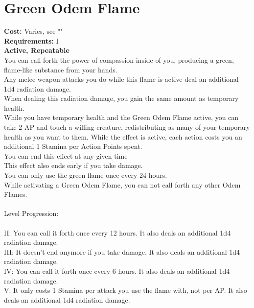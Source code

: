 \section{Green Odem Flame}\label{perk:greenOdemFlame}
\textbf{Cost:} Varies, see ""\\
\textbf{Requirements:} I\\
\textbf{Active, Repeatable}\\
You can call forth the power of compassion inside of you, producing a green, flame-like substance from your hands.\\
Any melee weapon attacks you do while this flame is active deal an additional 1d4 radiation damage.\\
When dealing this radiation damage, you gain the same amount as temporary health.\\
While you have temporary health and the Green Odem Flame active, you can take 2 AP and touch a willing creature, redistributing as many of your temporary health as you want to them.
While the effect is active, each action costs you an additional 1 Stamina per Action Points spent.\\
You can end this effect at any given time\\
This effect also ends early if you take damage.\\
You can only use the green flame once every 24 hours.\\
While activating a Green Odem Flame, you can not call forth any other Odem Flames.\\
\\
Level Progression:\\
\\
II: You can call it forth once every 12 hours.
It also deals an additional 1d4 radiation damage.\\
III: It doesn't end anymore if you take damage.
It also deals an additional 1d4 radiation damage.\\
IV: You can call it forth once every 6 hours.
It also deals an additional 1d4 radiation damage.\\
V: It only costs 1 Stamina per attack you use the flame with, not per AP.
It also deals an additional 1d4 radiation damage.\\